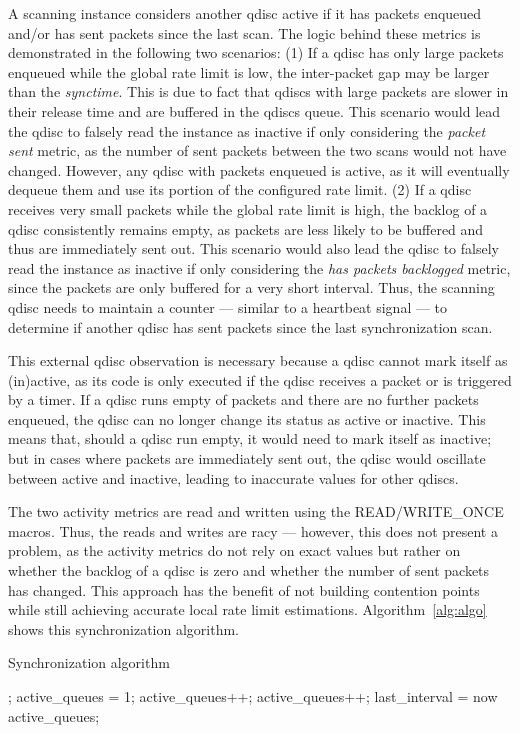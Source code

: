 A scanning instance considers another qdisc active if it has packets enqueued and/or has sent packets since the last scan.
%
The logic behind these metrics is demonstrated in the following two scenarios:
%
(1) If a qdisc has only large packets enqueued while the global rate limit is low, the inter-packet gap may be larger than the \textit{synctime}.
This is due to fact that qdiscs with large packets are slower in their release time and are buffered in the qdiscs queue.
%
This scenario would lead the qdisc to falsely read the instance as inactive if only considering the \textit{packet sent} metric, as the number of sent packets between the two scans  would not have changed.
%
However, any qdisc with packets enqueued is active, as it will eventually dequeue them and use its portion of the configured rate limit.
%
(2) If a qdisc receives very small packets while the global rate limit is high, the backlog of a qdisc consistently remains empty, as packets are less likely to be buffered and thus are immediately sent out.
%
This scenario would also lead the qdisc to falsely read the instance as inactive if only considering the \textit{has packets backlogged} metric, since the packets are only buffered for a very short interval.
%
Thus, the scanning qdisc needs to maintain a counter --- similar to a heartbeat signal --- to determine if another qdisc has sent packets since the last synchronization scan.
%

This external qdisc observation is necessary because a qdisc cannot mark itself as (in)active, as its code is only executed if the qdisc receives a packet or is triggered by a timer.
%
If a qdisc runs empty of packets and there are no further packets enqueued, the qdisc can no longer change its status as active or inactive.
%
This means that, should a qdisc run empty, it would need to mark itself as inactive; but in cases where packets are immediately sent out, the qdisc would oscillate
between active and inactive, leading to inaccurate values for other qdiscs. 
%

The two activity metrics are read and written using the READ/WRITE\_ONCE macros.
%
Thus, the reads and writes are racy --- however, this does not present a problem, as the activity metrics do not rely on exact values but rather on whether the backlog of a qdisc is zero and whether the number of sent packets has changed.
%
This approach has the benefit of not building contention points while still achieving accurate local rate limit estimations.
%
Algorithm~\ref{alg:algo} shows this synchronization algorithm.

\begin{algorithm}[h]
    \caption{Synchronization algorithm}\label{alg:algo}
\begin{algorithmic}[1]
    \State {};
\EndIf
\State active\_queues = 1;
    \State active\_queues++;
    \State active\_queues++;
    \EndIf
\EndFor
\State last\_interval = now
\State \Return active\_queues;
\EndProcedure
\end{algorithmic}
\end{algorithm}
